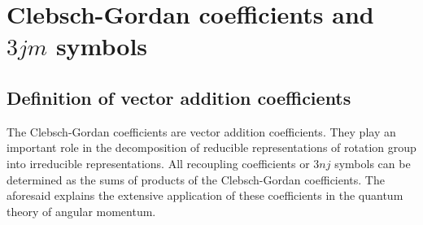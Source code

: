 \chapter{Clebsch-Gordan coefficients and $3 j m$ symbols}\label{chap:8}
\section{Definition of vector addition coefficients}\label{sec:8.1}
The Clebsch-Gordan coefficients are vector addition coefficients. They play an important role in the decomposition of reducible representations of rotation group into irreducible representations. All recoupling coefficients or $3 n j$ symbols can be determined as the sums of products of the Clebsch-Gordan coefficients. The aforesaid explains the extensive application of these coefficients in the quantum theory of angular momentum.

